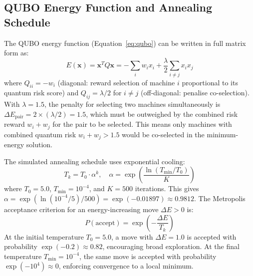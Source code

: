 \subsection{QUBO Energy Function and Annealing Schedule}

The QUBO energy function (Equation~\ref{eq:qubo}) can be written in full matrix form as:
\begin{equation}
    E(\mathbf{x}) = \mathbf{x}^T Q \mathbf{x} = -\sum_{i} w_i x_i + \frac{\lambda}{2}\sum_{i \neq j} x_i x_j
    \label{eq:qubo_full}
    \label{eq:qubo}
\end{equation}
where $Q_{ii} = -w_i$ (diagonal: reward selection of machine $i$ proportional to its quantum risk score) and $Q_{ij} = \lambda/2$ for $i \neq j$ (off-diagonal: penalise co-selection). With $\lambda = 1.5$, the penalty for selecting two machines simultaneously is $\Delta E_{\text{pair}} = 2 \times (\lambda/2) = 1.5$, which must be outweighed by the combined risk reward $w_i + w_j$ for the pair to be selected. This means only machines with combined quantum risk $w_i + w_j > 1.5$ would be co-selected in the minimum-energy solution.

The simulated annealing schedule uses exponential cooling:
\begin{equation}
    T_k = T_0 \cdot \alpha^k, \quad \alpha = \exp\!\left(\frac{\ln(T_{\min}/T_0)}{K}\right)
    \label{eq:sa_schedule}
\end{equation}
where $T_0 = 5.0$, $T_{\min} = 10^{-4}$, and $K = 500$ iterations. This gives $\alpha = \exp(\ln(10^{-4}/5)/500) = \exp(-0.01897) \approx 0.9812$. The Metropolis acceptance criterion for an energy-increasing move $\Delta E > 0$ is:
\begin{equation}
    P(\text{accept}) = \exp\!\left(-\frac{\Delta E}{T_k}\right)
    \label{eq:metropolis}
\end{equation}
At the initial temperature $T_0 = 5.0$, a move with $\Delta E = 1.0$ is accepted with probability $\exp(-0.2) \approx 0.82$, encouraging broad exploration. At the final temperature $T_{\min} = 10^{-4}$, the same move is accepted with probability $\exp(-10^4) \approx 0$, enforcing convergence to a local minimum.

